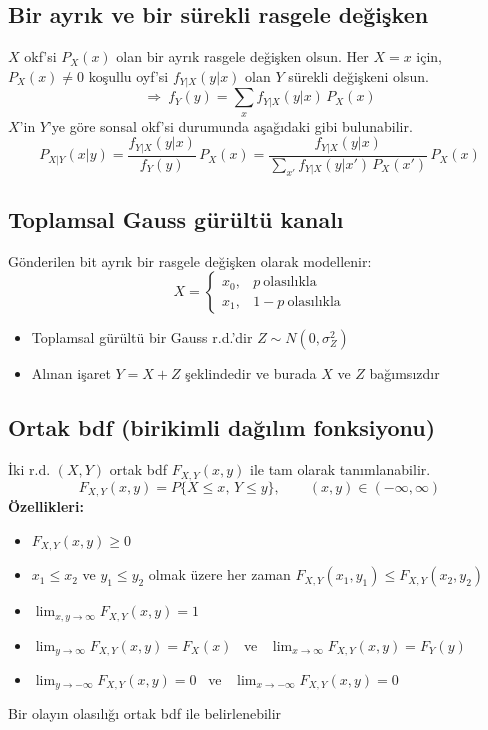 \documentclass[11pt,a4paper]{article}
\begin{document}
\subsection{Bir ayrık ve bir sürekli rasgele değişken}
$X$ okf'si $P_X(x)$ olan bir ayrık rasgele değişken olsun. Her $X=x$ için, $P_X(x)\neq 0$ koşullu oyf'si $f_{Y|X}(y|x)$ olan $Y$ sürekli değişkeni olsun.
\[ \Rightarrow\ f_Y(y)=\sum_{x}f_{Y|X}(y|x)\,P_X(x) \]
$X$'in $Y$'ye göre sonsal okf'si  durumunda aşağıdaki gibi bulunabilir.
\[ P_{X|Y}(x|y)=\frac{f_{Y|X}(y|x)}{f_Y(y)}\,P_X(x)=\frac{f_{Y|X}(y|x)}{\sum_{x'}f_{Y|X}(y|x')\,P_X(x')}\,P_X(x) \]

\subsection{Toplamsal Gauss gürültü kanalı}
\begin{center}
\end{center}
Gönderilen bit ayrık bir rasgele değişken olarak modellenir:
\[ X=\begin{cases} x_0, & p\ \text{olasılıkla}\\ x_1, & 1-p\ \text{olasılıkla}\end{cases} \]
\begin{itemize}
  \item Toplamsal gürültü bir Gauss r.d.'dir \quad $Z\sim N(0,\sigma_Z^2)$
  \item Alınan işaret $Y=X+Z$ şeklindedir ve burada $X$ ve $Z$ bağımsızdır
\end{itemize}

\subsection{Ortak bdf (birikimli dağılım fonksiyonu)}
İki r.d. $(X,Y)$ ortak bdf $F_{X,Y}(x,y)$ ile tam olarak tanımlanabilir.
\[ F_{X,Y}(x,y)=P\{X\le x,\,Y\le y\},\qquad (x,y)\in(-\infty,\infty) \]
\textbf{Özellikleri:}
\begin{itemize}
  \item $F_{X,Y}(x,y)\geq 0$
  \item $x_1\le x_2$ ve $y_1\le y_2$ olmak üzere her zaman $F_{X,Y}(x_1,y_1)\le F_{X,Y}(x_2,y_2)$
  \item $\displaystyle\lim_{x,y\to\infty}F_{X,Y}(x,y)=1$
  \item $\displaystyle\lim_{y\to\infty}F_{X,Y}(x,y)=F_X(x)$ \ ve \ $\displaystyle\lim_{x\to\infty}F_{X,Y}(x,y)=F_Y(y)$
  \item $\displaystyle\lim_{y\to-\infty}F_{X,Y}(x,y)=0$ \ ve \ $\displaystyle\lim_{x\to-\infty}F_{X,Y}(x,y)=0$
\end{itemize}
\vurgu[pembe]{$\star$} Bir olayın olasılığı ortak bdf ile belirlenebilir
\end{document}
